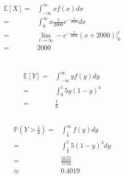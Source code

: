 \documentclass{article}
\begin{document}
    \section{}
        \begin{equation*}
            \begin{split}
                \mathbb{E}[X]=&\int_{-\infty}^\infty xf(x)dx\\
                    =&\int_0^\infty x\frac{1}{2000}e^{-\frac{x}{2000}}dx\\
                    =&\lim_{t\rightarrow \infty}-e^{-\frac{x}{2000}}(x+2000)|_0^t\\
                    =&2000
            \end{split}
        \end{equation*}
    \section{}
        \subsection{}
            \begin{equation*}
                \begin{split}
                    \mathbb{E}[Y]=&\int_{-\infty}^\infty yf(y)dy\\
                        =&\int_0^1 5y(1-y)^4\\
                        =&\frac{1}{6}
                \end{split}
            \end{equation*}
        \subsection{}
            \begin{equation*}
                \begin{split}
                    \mathbb{P}(Y>\frac{1}{6})=&\int_\frac{1}{6}^\infty f(y)dy\\
                        =&\int_\frac{1}{6}^1 5(1-y)^4dy\\
                        =&\frac{3125}{7776}\\
                        \approx& 0.4019
                \end{split}
            \end{equation*}
    \section{}
\end{document}
